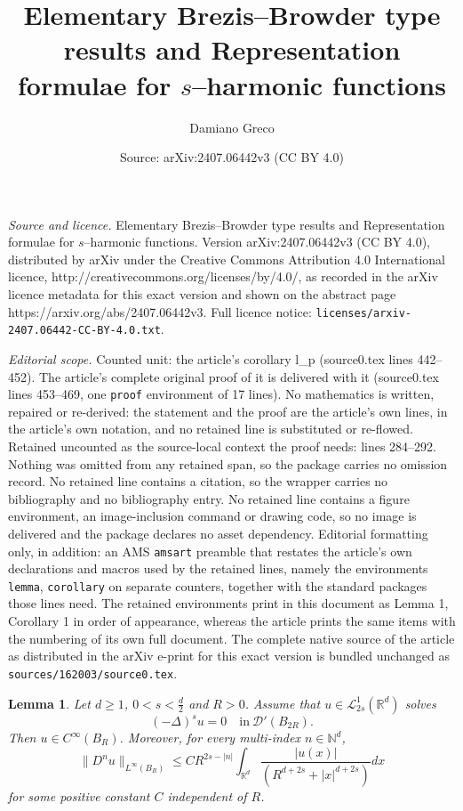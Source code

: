 \documentclass[10pt,a4paper]{amsart}
\title{Elementary Brezis--Browder type results and Representation formulae for $s$--harmonic functions}
\author{Damiano Greco}
\date{Source: arXiv:2407.06442v3 (CC BY 4.0)}
\newtheorem{lemma}{Lemma}
\newcommand{\N}{{\mathbb N}}
\newcommand{\R}{{\mathbb R}}
\begin{document}
\maketitle

\noindent\emph{Source and licence.} Elementary Brezis--Browder type results and Representation formulae for $s$--harmonic functions. Version arXiv:2407.06442v3 (CC BY 4.0), distributed by arXiv under the Creative Commons Attribution 4.0 International licence, http://creativecommons.org/licenses/by/4.0/, as recorded in the arXiv licence metadata for this exact version and shown on the abstract page https://arxiv.org/abs/2407.06442v3. Full licence notice: \texttt{licenses/arxiv-2407.06442-CC-BY-4.0.txt}.\par\smallskip

\noindent\textit{Editorial scope.} Counted unit: the article's corollary l\_p (source0.tex lines 442--452). The article's complete original proof of it is delivered with it (source0.tex lines 453--469, one \texttt{proof} environment of 17 lines). No mathematics is written, repaired or re-derived: the statement and the proof are the article's own lines, in the article's own notation, and no retained line is substituted or re-flowed.  Retained uncounted as the source-local context the proof needs: lines 284--292.  Nothing was omitted from any retained span, so the package carries no omission record.  No retained line contains a citation, so the wrapper carries no bibliography and no bibliography entry.  No retained line contains a figure environment, an image-inclusion command or drawing code, so no image is delivered and the package declares no asset dependency.  Editorial formatting only, in addition: an AMS \texttt{amsart} preamble that restates the article's own declarations and macros used by the retained lines, namely the environments \texttt{lemma}, \texttt{corollary} on separate counters, together with the standard packages those lines need.  The retained environments print in this document as Lemma 1, Corollary 1 in order of appearance, whereas the article prints the same items with the numbering of its own full document.  The complete native source of the article as distributed in the arXiv e-print for this exact version is bundled unchanged as \texttt{sources/162003/source0.tex}.
	\begin{lemma}\label{lemma_1}
		Let $d\ge 1$,  $0<s<\frac{d}{2}$ and $R>0$. Assume that $u\in \mathscr{L}^{1}_{2s}(\R^d)$ solves 
		\begin{equation*}\label{eq_00}
			(-\Delta)^{s}u=0\quad \text{in}\ \mathscr{D}'(B_{2R}).
		\end{equation*}
		Then $u\in C^{\infty}(B_R)$. Moreover, for every multi-index $n\in \N^{d}$,
		$$\|D^{n}u\|_{L^{\infty}({B_R})}\le CR^{2s-|n|}\int_{\R^d}\frac{|u(x)|}{(R^{d+2s}+|x|^{d+2s})}dx$$
		for some positive constant $C$ independent of $R$.
	\end{lemma}
\end{document}
